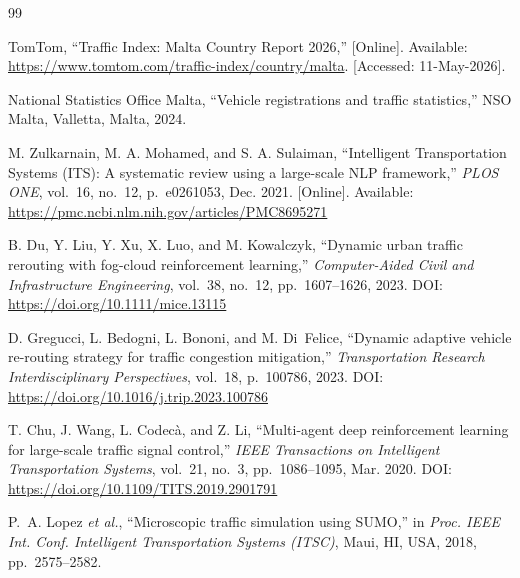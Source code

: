 \documentclass[conference]{IEEEtran}
\begin{document}
\begin{thebibliography}{99}

TomTom,
``Traffic Index: Malta Country Report 2026,''
[Online]. Available: \url{https://www.tomtom.com/traffic-index/country/malta}.
[Accessed: 11-May-2026].

National Statistics Office Malta,
``Vehicle registrations and traffic statistics,''
NSO Malta, Valletta, Malta, 2024.

M. Zulkarnain, M. A. Mohamed, and S. A. Sulaiman,
``Intelligent Transportation Systems (ITS): A systematic review using a
large-scale NLP framework,''
\textit{PLOS ONE}, vol.~16, no.~12, p.~e0261053, Dec. 2021.
[Online]. Available: \url{https://pmc.ncbi.nlm.nih.gov/articles/PMC8695271}

B. Du, Y. Liu, Y. Xu, X. Luo, and M. Kowalczyk,
``Dynamic urban traffic rerouting with fog-cloud reinforcement learning,''
\textit{Computer-Aided Civil and Infrastructure Engineering},
vol.~38, no.~12, pp.~1607--1626, 2023.
DOI: \url{https://doi.org/10.1111/mice.13115}

D. Gregucci, L. Bedogni, L. Bononi, and M. Di~Felice,
``Dynamic adaptive vehicle re-routing strategy for traffic congestion
mitigation,''
\textit{Transportation Research Interdisciplinary Perspectives},
vol.~18, p.~100786, 2023.
DOI: \url{https://doi.org/10.1016/j.trip.2023.100786}

T. Chu, J. Wang, L. Codec\`{a}, and Z. Li,
``Multi-agent deep reinforcement learning for large-scale traffic signal
control,''
\textit{IEEE Transactions on Intelligent Transportation Systems},
vol.~21, no.~3, pp.~1086--1095, Mar. 2020.
DOI: \url{https://doi.org/10.1109/TITS.2019.2901791}

P.~A. Lopez \textit{et al.},
``Microscopic traffic simulation using SUMO,''
in \textit{Proc. IEEE Int. Conf. Intelligent Transportation Systems (ITSC)},
Maui, HI, USA, 2018, pp.~2575--2582.

\end{thebibliography}
\end{document}
